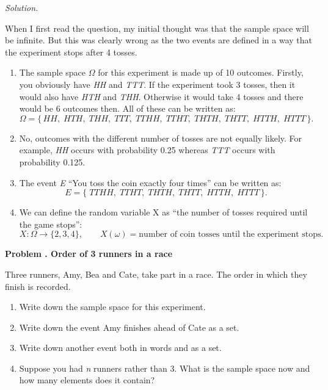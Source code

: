 \documentclass[11pt]{article}
\newcounter{problem}
\newenvironment{problem}[1][]{%
  \refstepcounter{problem}%
  \bigskip\noindent\textbf{Problem \theproblem. #1}\par\smallskip
}{\bigskip}
\newenvironment{solution}{%
  \noindent\textit{Solution.}\quad
}{\par\bigskip}
\begin{document}
\begin{solution}
When I first read the question, my initial thought was that the sample space will 
be infinite. But this was clearly wrong as the two events are defined in a way that 
the experiment stops after 4 tosses.
\begin{enumerate}
      \item The sample space $\Omega$ for this experiment is made up of 10 outcomes. Firstly, you 
            obviously have \textit{HH} and \textit{TTT}. If the experiment took 3 tosses,
            then it would also have \textit{HTH} and \textit{THH}. Otherwise it would take 
            4 tosses and there would be 6 outcomes then. All of these can be written as:
            \[
            \Omega = \{\,HH,\;HTH,\;THH,\;TTT,\;TTHH,\;TTHT,\;THTH,\;THTT,\;HTTH,\;HTTT\,\}.
            \]
      \item No, outcomes with the different number of tosses are not equally likely. 
            For example, \textit{HH} occurs with probability 0.25 whereas \textit{TTT} 
            occurs with probability 0.125.
      \item The event \textit{E} ``You toss the coin exactly four times'' can be written as:
            \[
            E = \{\;TTHH,\;TTHT,\;THTH,\;THTT,\;HTTH,\;HTTT\,\}.
            \]
      \item We can define the random variable X as ``the number of tosses required until the game stops'':
            \[
            X : \Omega \to \{2,3,4\}, \qquad
            X(\omega) = \text{number of coin tosses until the experiment stops}.
            \]
\end{enumerate}
\end{solution}

\begin{problem}[Order of 3 runners in a race]
Three runners, Amy, Bea and Cate, take part in a race. The order in which they finish
is recorded.
\begin{enumerate}
      \item Write down the sample space for this experiment.
      \item Write down the event Amy finishes ahead of Cate as a set.
      \item Write down another event both in words and as a set.
      \item Suppose you had \textit{n} runners rather than 3. What is the sample space now 
            and how many elements does it contain?
\end{enumerate}
\end{problem}
\end{document}
